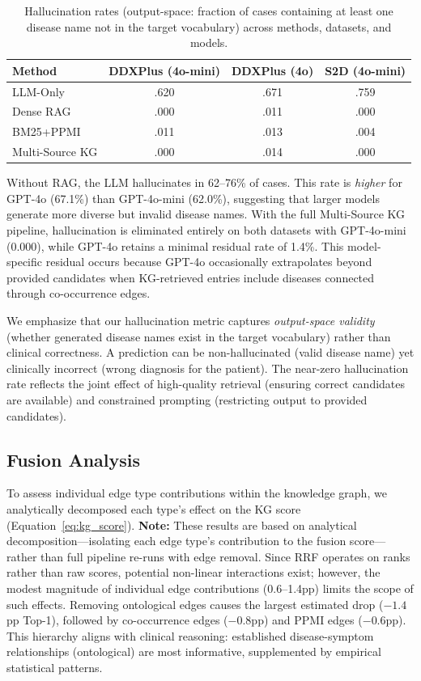 \documentclass[runningheads]{llncs}
\begin{document}
\begin{table}[t]
\centering
\caption{Hallucination rates (output-space: fraction of cases containing at least one disease name not in the target vocabulary) across methods, datasets, and models.}
\label{tab:halluc}
\begin{tabular}{lccc}
\toprule
\textbf{Method} & \textbf{DDXPlus (4o-mini)} & \textbf{DDXPlus (4o)} & \textbf{S2D (4o-mini)} \\
\midrule
LLM-Only        & .620 & .671 & .759 \\
Dense RAG        & .000 & .011 & .000 \\
BM25+PPMI        & .011 & .013 & .004 \\
Multi-Source KG  & .000 & .014 & .000 \\
\bottomrule
\end{tabular}
\end{table}

Without RAG, the LLM hallucinates in 62--76\% of cases. This rate is \emph{higher} for GPT-4o (67.1\%) than GPT-4o-mini (62.0\%), suggesting that larger models generate more diverse but invalid disease names. With the full Multi-Source KG pipeline, hallucination is eliminated entirely on both datasets with GPT-4o-mini (0.000), while GPT-4o retains a minimal residual rate of 1.4\%. This model-specific residual occurs because GPT-4o occasionally extrapolates beyond provided candidates when KG-retrieved entries include diseases connected through co-occurrence edges.

We emphasize that our hallucination metric captures \emph{output-space validity} (whether generated disease names exist in the target vocabulary) rather than clinical correctness. A prediction can be non-hallucinated (valid disease name) yet clinically incorrect (wrong diagnosis for the patient). The near-zero hallucination rate reflects the joint effect of high-quality retrieval (ensuring correct candidates are available) and constrained prompting (restricting output to provided candidates).

\subsection{Fusion Analysis}
\label{sec:fusion_analysis}

To assess individual edge type contributions within the knowledge graph, we analytically decomposed each type's effect on the KG score (Equation~\ref{eq:kg_score}). \textbf{Note:} These results are based on analytical decomposition---isolating each edge type's contribution to the fusion score---rather than full pipeline re-runs with edge removal. Since RRF operates on ranks rather than raw scores, potential non-linear interactions exist; however, the modest magnitude of individual edge contributions (0.6--1.4pp) limits the scope of such effects. Removing ontological edges causes the largest estimated drop ($-1.4$pp Top-1), followed by co-occurrence edges ($-0.8$pp) and PPMI edges ($-0.6$pp). This hierarchy aligns with clinical reasoning: established disease-symptom relationships (ontological) are most informative, supplemented by empirical statistical patterns.
\end{document}
